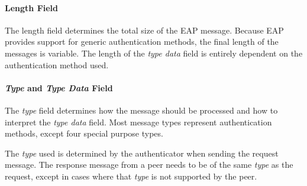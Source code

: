 \paragraph{Length Field}
The length field determines the total size of the EAP message. Because EAP provides support for generic authentication methods, the final length of the messages is variable.
The length of the \textit{type data} field is entirely dependent on the authentication method used.

\medskip

\paragraph{\textit{Type} and \textit{Type Data} Field}
The \textit{type} field determines how the message should be processed and how to interpret the \textit{type data} field.
Most message types represent authentication methods, except four special purpose types.

The \textit{type} used is determined by the authenticator when sending the request message. The response message from a peer needs to be of the same \textit{type} as the request, except in cases where that \textit{type} is not supported by the peer.


